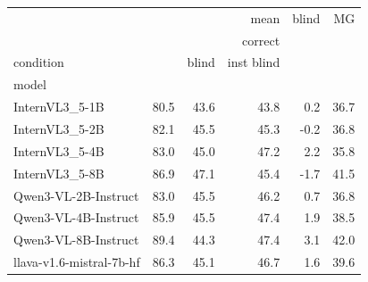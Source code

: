 \begin{tabular}{lrrrrr}
\toprule
 & \multicolumn{3}{r}{mean} & blind & MG \\
 & \multicolumn{3}{r}{correct} &  &  \\
condition &  & blind & inst blind &  &  \\
model &  &  &  &  &  \\
\midrule
InternVL3_5-1B & 80.5 & 43.6 & 43.8 & 0.2 & 36.7 \\
InternVL3_5-2B & 82.1 & 45.5 & 45.3 & -0.2 & 36.8 \\
InternVL3_5-4B & 83.0 & 45.0 & 47.2 & 2.2 & 35.8 \\
InternVL3_5-8B & 86.9 & 47.1 & 45.4 & -1.7 & 41.5 \\
Qwen3-VL-2B-Instruct & 83.0 & 45.5 & 46.2 & 0.7 & 36.8 \\
Qwen3-VL-4B-Instruct & 85.9 & 45.5 & 47.4 & 1.9 & 38.5 \\
Qwen3-VL-8B-Instruct & 89.4 & 44.3 & 47.4 & 3.1 & 42.0 \\
llava-v1.6-mistral-7b-hf & 86.3 & 45.1 & 46.7 & 1.6 & 39.6 \\
\bottomrule
\end{tabular}
